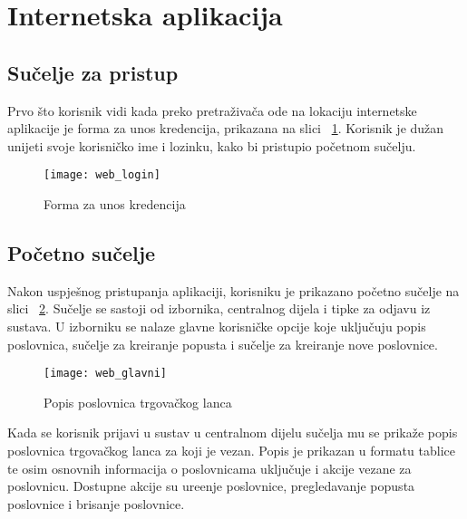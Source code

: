 \section{Internetska aplikacija}

\subsection{Su\v{c}elje za pristup}

Prvo \v{s}to korisnik vidi kada preko pretra\v{z}iva\v{c}a ode na lokaciju internetske aplikacije je forma za unos kredencija, prikazana na slici ~\ref{fig:webLogin}. Korisnik je du\v{z}an unijeti svoje korisni\v{c}ko ime i lozinku, kako bi pristupio po\v{c}etnom su\v{c}elju.

\begin{figure}[!htbp]
	\begin{center}
 \texttt{[image: web\_login]}
 \caption{Forma za unos kredencija}
 \label{fig:webLogin}
	\end{center}
\end{figure}


\subsection{Po\v{c}etno su\v{c}elje}

Nakon uspje\v{s}nog pristupanja aplikaciji, korisniku je prikazano po\v{c}etno su\v{c}elje na slici ~\ref{fig:web_glavni}. Su\v{c}elje se sastoji od izbornika, centralnog dijela i tipke za odjavu iz sustava. U izborniku se nalaze glavne korisni\v{c}ke opcije koje uklju\v{c}uju popis poslovnica, su\v{c}elje za kreiranje popusta i su\v{c}elje za kreiranje nove poslovnice.


\begin{figure}[!htbp]
	\begin{center}
 \texttt{[image: web\_glavni]}
 \caption{Popis poslovnica trgova\v{c}kog lanca}
 \label{fig:web_glavni}
	\end{center}
\end{figure}

Kada se korisnik prijavi u sustav u centralnom dijelu su\v{c}elja mu se prika\v{z}e popis poslovnica trgova\v{c}kog lanca za koji je vezan. Popis je prikazan u formatu tablice te osim osnovnih informacija o poslovnicama uklju\v{c}uje i akcije vezane za poslovnicu. Dostupne akcije su ure\dj enje poslovnice, pregledavanje popusta poslovnice i brisanje poslovnice.



